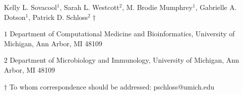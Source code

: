 
\begin{center}
\vspace{25mm}

Kelly L. Sovacool${^1}$, Sarah L. Westcott${^2}$, M. Brodie Mumphrey${^1}$, Gabrielle A. Dotson${^1}$, Patrick D. Schloss${^2\dagger}$

$1$ Department of Computational Medicine and Bioinformatics,
University of Michigan, Ann Arbor, MI 48109

$2$ Department of Microbiology and Immunology,
University of Michigan, Ann Arbor, MI 48109

\vspace{30mm}

$\dagger$ To whom correspondence should be addressed: pschloss@umich.edu

\end{center}


\newpage
\linenumbers
